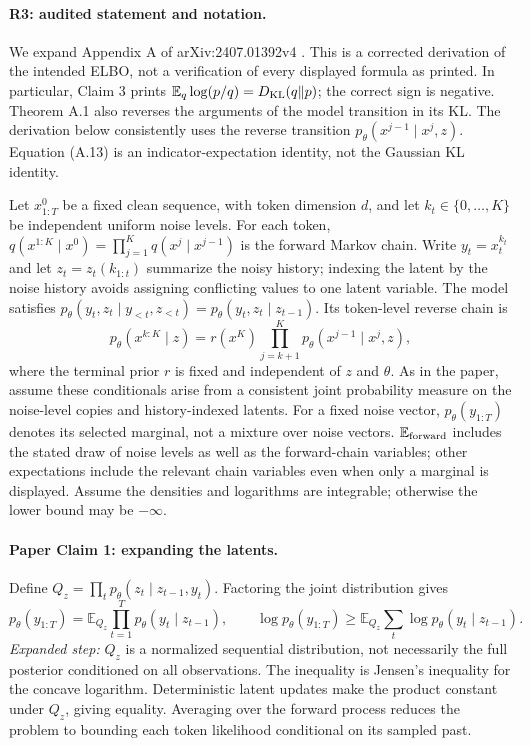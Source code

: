 \paragraph{R3: audited statement and notation.}
We expand Appendix A of arXiv:2407.01392v4 \cite{chen2025diffusion}. This is a corrected derivation of the intended ELBO, not a verification of every displayed formula as printed. In particular, Claim 3 prints $\mathbb E_q\log(p/q)=D_{\rm KL}(q\Vert p)$; the correct sign is negative. Theorem A.1 also reverses the arguments of the model transition in its KL. The derivation below consistently uses the reverse transition $p_\theta(x^{j-1}\mid x^j,z)$. Equation (A.13) is an indicator-expectation identity, not the Gaussian KL identity.

Let $x^0_{1:T}$ be a fixed clean sequence, with token dimension $d$, and let $k_t\in\{0,\ldots,K\}$ be independent uniform noise levels. For each token, $q(x^{1:K}\mid x^0)=\prod_{j=1}^Kq(x^j\mid x^{j-1})$ is the forward Markov chain. Write $y_t=x_t^{k_t}$ and let $z_t=z_t(k_{1:t})$ summarize the noisy history; indexing the latent by the noise history avoids assigning conflicting values to one latent variable. The model satisfies $p_\theta(y_t,z_t\mid y_{<t},z_{<t})=p_\theta(y_t,z_t\mid z_{t-1})$. Its token-level reverse chain is
\[
 p_\theta(x^{k:K}\mid z)=r(x^K)\prod_{j=k+1}^Kp_\theta(x^{j-1}\mid x^j,z),
\]
where the terminal prior $r$ is fixed and independent of $z$ and $\theta$. As in the paper, assume these conditionals arise from a consistent joint probability measure on the noise-level copies and history-indexed latents. For a fixed noise vector, $p_\theta(y_{1:T})$ denotes its selected marginal, not a mixture over noise vectors. $\mathbb E_{\rm forward}$ includes the stated draw of noise levels as well as the forward-chain variables; other expectations include the relevant chain variables even when only a marginal is displayed. Assume the densities and logarithms are integrable; otherwise the lower bound may be $-\infty$.

\paragraph{Paper Claim 1: expanding the latents.}
Define $Q_z=\prod_t p_\theta(z_t\mid z_{t-1},y_t)$. Factoring the joint distribution gives
\[
 p_\theta(y_{1:T})=\mathbb E_{Q_z}\prod_{t=1}^T p_\theta(y_t\mid z_{t-1}),\qquad
 \log p_\theta(y_{1:T})\geq\mathbb E_{Q_z}\sum_t\log p_\theta(y_t\mid z_{t-1}).
\]
\emph{Expanded step:} $Q_z$ is a normalized sequential distribution, not necessarily the full posterior conditioned on all observations. The inequality is Jensen's inequality for the concave logarithm. Deterministic latent updates make the product constant under $Q_z$, giving equality. Averaging over the forward process reduces the problem to bounding each token likelihood conditional on its sampled past.


